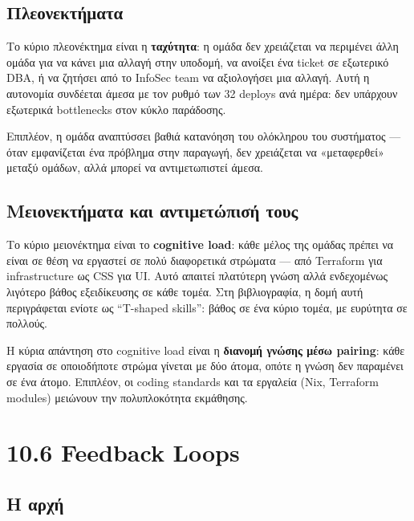 \subsection{Πλεονεκτήματα}\label{ux3c0ux3bbux3b5ux3bfux3bdux3b5ux3baux3c4ux3aeux3bcux3b1ux3c4ux3b1}

Το κύριο πλεονέκτημα είναι η \textbf{ταχύτητα}: η ομάδα δεν χρειάζεται
να περιμένει άλλη ομάδα για να κάνει μια αλλαγή στην υποδομή, να ανοίξει
ένα ticket σε εξωτερικό DBA, ή να ζητήσει από το InfoSec team να
αξιολογήσει μια αλλαγή. Αυτή η αυτονομία συνδέεται άμεσα με τον ρυθμό
των 32 deploys ανά ημέρα: δεν υπάρχουν εξωτερικά bottlenecks στον κύκλο
παράδοσης.

Επιπλέον, η ομάδα αναπτύσσει βαθιά κατανόηση του ολόκληρου του
συστήματος --- όταν εμφανίζεται ένα πρόβλημα στην παραγωγή, δεν
χρειάζεται να «μεταφερθεί» μεταξύ ομάδων, αλλά μπορεί να αντιμετωπιστεί
άμεσα.

\subsection{Μειονεκτήματα και αντιμετώπισή
τους}\label{ux3bcux3b5ux3b9ux3bfux3bdux3b5ux3baux3c4ux3aeux3bcux3b1ux3c4ux3b1-ux3baux3b1ux3b9-ux3b1ux3bdux3c4ux3b9ux3bcux3b5ux3c4ux3ceux3c0ux3b9ux3c3ux3ae-ux3c4ux3bfux3c5ux3c2}

Το κύριο μειονέκτημα είναι το \textbf{cognitive load}: κάθε μέλος της
ομάδας πρέπει να είναι σε θέση να εργαστεί σε πολύ διαφορετικά στρώματα
--- από Terraform για infrastructure ως CSS για UI. Αυτό απαιτεί
πλατύτερη γνώση αλλά ενδεχομένως λιγότερο βάθος εξειδίκευσης σε κάθε
τομέα. Στη βιβλιογραφία, η δομή αυτή περιγράφεται ενίοτε ως ``T-shaped
skills'': βάθος σε ένα κύριο τομέα, με ευρύτητα σε πολλούς.

Η κύρια απάντηση στο cognitive load είναι η \textbf{διανομή γνώσης μέσω
pairing}: κάθε εργασία σε οποιοδήποτε στρώμα γίνεται με δύο άτομα, οπότε
η γνώση δεν παραμένει σε ένα άτομο. Επιπλέον, οι coding standards και τα
εργαλεία (Nix, Terraform modules) μειώνουν την πολυπλοκότητα εκμάθησης.

\section{10.6 Feedback Loops}\label{feedback-loops}

\subsection{Η αρχή}\label{ux3b7-ux3b1ux3c1ux3c7ux3ae}

